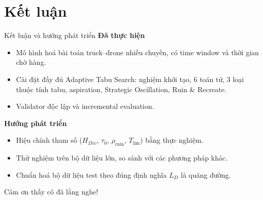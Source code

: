 \documentclass[aspectratio=169]{beamer}
\begin{document}
\section{Kết luận}

\begin{frame}{Kết luận và hướng phát triển}
  \textbf{Đã thực hiện}
  \begin{itemize}
    \item \small Mô hình hoá bài toán truck--drone nhiều chuyến, có time window và thời gian chờ hàng.
    \item \small Cài đặt đầy đủ Adaptive Tabu Search: nghiệm khởi tạo, 6 toán tử, 3 loại thuộc tính tabu, aspiration, Strategic Oscillation, Ruin \& Recreate.
    \item \small Validator độc lập và incremental evaluation.
  \end{itemize}

  \vspace{2mm}
  \textbf{Hướng phát triển}
  \begin{itemize}
    \item \small Hiệu chỉnh tham số ($H_{Div}$, $\tau_0$, $\rho_{\text{ruin}}$, $T_{\lim}$) bằng thực nghiệm.
    \item \small Thử nghiệm trên bộ dữ liệu lớn, so sánh với các phương pháp khác.
    \item \small Chuẩn hoá bộ dữ liệu test theo đúng định nghĩa $L_D$ là quãng đường.
  \end{itemize}
\end{frame}

\begin{frame}
  \centering
  \Huge Cảm ơn thầy cô đã lắng nghe!
\end{frame}
\end{document}
